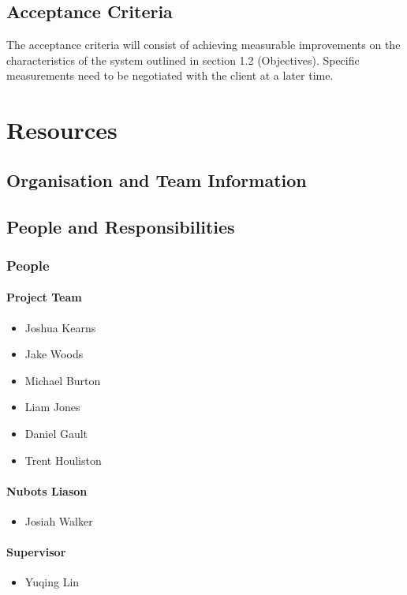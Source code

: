 \documentclass[a4paper]{article}
\begin{document}
		\subsection {Acceptance Criteria}
			The acceptance criteria will consist of achieving measurable improvements on the characteristics of the system outlined in section 1.2 (Objectives). Specific measurements need to be negotiated with the client at a later time.
	
	\section{Resources}
		\subsection{Organisation and Team Information}
		\subsection{People and Responsibilities}
			\subsubsection{People}
				\paragraph{Project Team}
					\begin{itemize}
						\item Joshua Kearns
						\item Jake Woods
						\item Michael Burton
						\item Liam Jones
						\item Daniel Gault
						\item Trent Houliston
					\end{itemize}
				\paragraph{Nubots Liason}
					\begin{itemize}
						\item Josiah Walker
					\end{itemize}
				\paragraph{Supervisor}
					\begin{itemize}
						\item Yuqing Lin
					\end{itemize}
\end{document}
